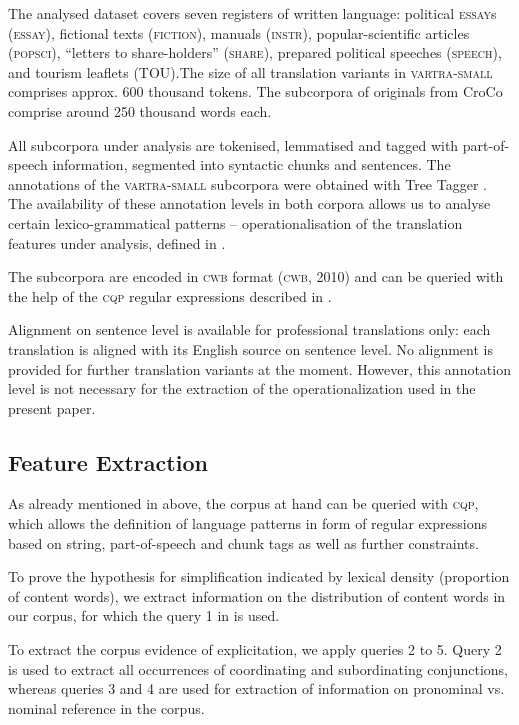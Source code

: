 \documentclass[output=paper]{LSP/langsci}
\begin{document}
The analysed dataset covers seven registers of written language: political \textsc{essay}s (\textsc{essay}), fictional texts (\textsc{fiction}), manuals (\textsc{instr}), popular-scientific articles (\textsc{popsci}), “letters to share-holders” (\textsc{share}), prepared political speeches (\textsc{speech}), and tourism leaflets (TOU).The size of all translation variants in \textsc{vartra}-\textsc{small} comprises approx. 600 thousand tokens.  The subcorpora of originals from CroCo comprise around 250 thousand words each.

All subcorpora under analysis are tokenised, lemmatised and tagged with part-of-speech information, segmented into syntactic chunks and sentences.  The annotations of the \textsc{vartra}-\textsc{small} subcorpora were obtained with Tree Tagger \citep{Schmid1994}. The availability of these annotation levels in both corpora allows us to analyse certain lexico-grammatical patterns – operationalisation of the translation features under analysis, defined in .

The subcorpora are encoded in \textsc{cwb} format (\textsc{cwb}, 2010) and can be queried with the help of the \textsc{cqp} regular expressions described in \citep{Evert2005}.

Alignment on sentence level is available for professional translations only: each translation is aligned with its English source on sentence level.  No alignment is provided for further translation variants at the moment. However, this annotation level is not necessary for the extraction of the operationalization used in the present paper.

\subsection{Feature Extraction}
As already mentioned in  above, the corpus at hand can be queried with \textsc{cqp}, which allows the definition of language patterns in form of regular expressions based on string, part-of-speech and chunk tags as well as further constraints.

To prove the hypothesis for simplification indicated by lexical density (proportion of content words), we extract information on the distribution of content words in our corpus, for which the query 1 in  is used.

To extract the corpus evidence of explicitation, we apply queries 2 to 5. Query 2 is used to extract all occurrences of coordinating and subordinating conjunctions, whereas queries 3 and 4 are used for extraction of information on pronominal vs. nominal reference in the corpus. 
\end{document}
